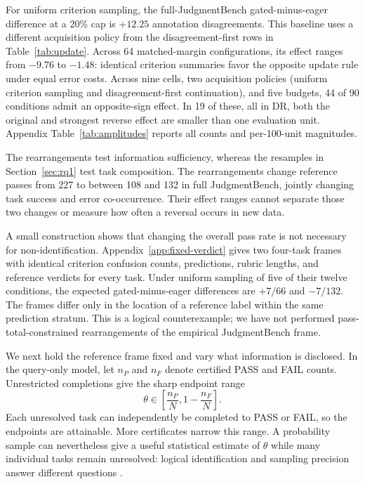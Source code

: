 \documentclass[10pt,letterpaper]{article}
\begin{document}
For uniform criterion sampling, the full-JudgmentBench gated-minus-eager difference at a 20\% cap is $+12.25$ annotation disagreements. This baseline uses a different acquisition policy from the disagreement-first rows in Table~\ref{tab:update}. Across 64 matched-margin configurations, its effect ranges from $-9.76$ to $-1.48$: identical criterion summaries favor the opposite update rule under equal error costs. Across nine cells, two acquisition policies (uniform criterion sampling and disagreement-first continuation), and five budgets, 44 of 90 conditions admit an opposite-sign effect. In 19 of these, all in DR, both the original and strongest reverse effect are smaller than one evaluation unit. Appendix Table~\ref{tab:amplitudes} reports all counts and per-100-unit magnitudes.

The rearrangements test information sufficiency, whereas the resamples in Section~\ref{sec:rq1} test task composition. The rearrangements change reference passes from 227 to between 108 and 132 in full JudgmentBench, jointly changing task success and error co-occurrence. Their effect ranges cannot separate those two changes or measure how often a reversal occurs in new data.

A small construction shows that changing the overall pass rate is not necessary for non-identification. Appendix~\ref{app:fixed-verdict} gives two four-task frames with identical criterion confusion counts, predictions, rubric lengths, and reference verdicts for every task. Under uniform sampling of five of their twelve conditions, the expected gated-minus-eager differences are $+7/66$ and $-7/132$. The frames differ only in the location of a reference label within the same prediction stratum. This is a logical counterexample; we have not performed pass-total-constrained rearrangements of the empirical JudgmentBench frame.

We next hold the reference frame fixed and vary what information is disclosed. In the query-only model, let $n_P$ and $n_F$ denote certified PASS and FAIL counts. Unrestricted completions give the sharp endpoint range
\begin{equation}\label{eq:bounds}
\theta\in\left[\frac{n_P}{N},1-\frac{n_F}{N}\right].
\end{equation}
Each unresolved task can independently be completed to PASS or FAIL, so the endpoints are attainable. More certificates narrow this range. A probability sample can nevertheless give a useful statistical estimate of $\theta$ while many individual tasks remain unresolved: logical identification and sampling precision answer different questions \citep{rao2026agreement,chen2026partial}.
\end{document}
